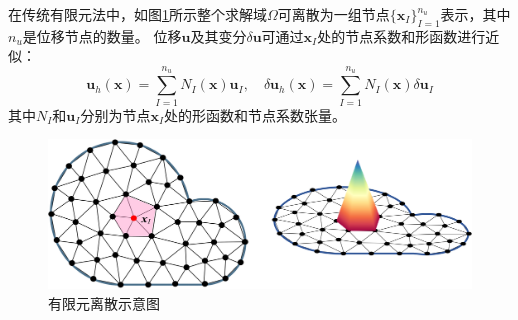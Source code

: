 在传统有限元法中，如图\ref{fem}所示整个求解域$\Omega$可离散为一组节点$\{\boldsymbol x_I\}_{I=1}^{n_u}$表示\cite{hughes2000}，其中$n_u$是位移节点的数量。
位移$\boldsymbol u$及其变分$\delta \boldsymbol u $可通过$\boldsymbol x_I$处的节点系数和形函数进行近似：
\begin{equation}\label{u_h}
    \boldsymbol u_h(\boldsymbol x) = \sum_{I=1}^{n_u} N_I(\boldsymbol x) \boldsymbol u_I, \quad
    \delta \boldsymbol u_h(\boldsymbol x) = \sum_{I=1}^{n_u} N_I(\boldsymbol x) \delta \boldsymbol u_I
\end{equation}
其中$N_I$和$\boldsymbol u_I$分别为节点$\boldsymbol{x}_I$处的形函数和节点系数张量。
\begin{figure}[H]
    \centering 
        \includegraphics[scale=0.05]{figures/fem.png}
        \caption{有限元离散示意图}\label{fem}
\end{figure}

